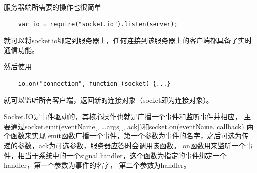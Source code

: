 \documentclass[11pt]{ctexart}
\begin{document}
服务器端所需要的操作也很简单
\begin{verbatim}
    var io = require("socket.io").listen(server);
\end{verbatim}
就可以将socket.io绑定到服务器上，任何连接到该服务器上的客户端都具备了实时通信功能。

然后使用
\begin{verbatim}
    io.on("connection", function (socket) {...}
\end{verbatim}
就可以监听所有客户端，返回新的连接对象（socket即为连接对象）。

Socket.IO是事件驱动的，其核心操作也就是广播一个事件和监听事件并相应，
主要通过\textsf{socket.emit(eventName[, ...args][, ack])}和\textsf{socket.on(eventName, callback)}
两个函数来实现
\textsf{emit}函数广播一个事件，第一个参数为事件的名字，之后可选为传递的参数，\textsf{ack}为可选参数，服务器应答时会调用该函数。
\textsf{on}函数用来监听一个事件，相当于系统中的一个signal handler，这个函数为指定的事件绑定一个handler，第一个参数为事件的名字，
第二个参数为handler。
\nocite{*}


\end{document}
